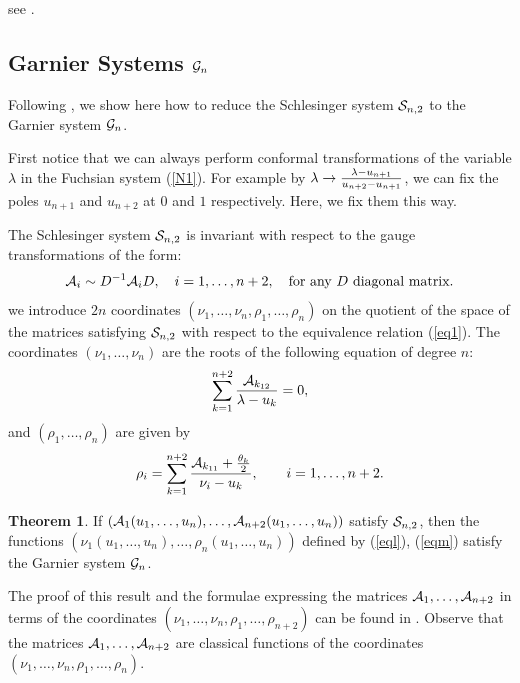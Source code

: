 \documentclass[12pt]{article}
\theoremstyle{definition}
\theoremstyle{theorem}
\newtheorem{thm}[df]{Theorem}
\begin{document}
 see \cite{Dek,AB}.





\subsection{Garnier Systems ${\cal G}_n$}

Following \cite{IKSY}, we show here how to reduce the Schlesinger 
system ${\cal S}_{n,2}$ to the Garnier system ${\cal G}_n$. 

First notice that we can always perform conformal transformations 
of the variable $\lambda$ in the Fuchsian system (\ref{N1}). For
example by $\lambda\to {\lambda-u_{n+1}\over u_{n+2}-u_{n+1}}$, 
we can fix the poles $u_{n+1}$ and $u_{n+2}$ at $0$ and $1$ 
respectively. Here, we fix them this way. 

The Schlesinger system ${\cal S}_{n,2}$ is invariant 
with respect to the gauge transformations of the form:
\begin{equation}
{\cal A}_i\sim D^{-1} {\cal A}_i D,\quad i=1,\dots,n+2,
\quad\hbox{for any $D$ diagonal matrix}.
\label{eq1}
\end{equation}
we introduce $2n$ coordinates 
$(\nu_1,\dots,\nu_{n},\rho_1,\dots,\rho_{n})$ on the quotient 
of the space of the matrices satisfying ${\cal S}_{n,2}$ with respect 
to the equivalence relation (\ref{eq1}).
The coordinates $(\nu_1,\dots,\nu_{n})$ are the roots of the 
following equation of degree $n$:
\begin{equation}
\sum_{k=1}^{n+2}{{\cal A}_{k_{12}}\over\lambda-u_k}=0, 
\label{eql}\end{equation}
and $(\rho_1,\dots,\rho_{n})$ are given by
\begin{equation}
\rho_i=\sum_{k=1}^{n+2}{{\cal A}_{k_{11}}+
{\theta_k\over2}\over\nu_i-u_k}, \qquad
i=1,\dots,n+2.
\label{eqm}\end{equation}


\begin{thm}
If $\left({\cal A}_1(u_1,\dots,u_{n}),\dots,
{\cal A}_{n+2}(u_1,\dots,u_{n})\right)$ 
satisfy ${\cal S}_{n,2}$, then the functions
$\left(\nu_1(u_1,\dots,u_{n}),
\dots,\rho_{n}(u_1,\dots,u_{n})\right)$ 
defined by (\ref{eql}), (\ref{eqm}) satisfy the Garnier system 
${\cal G}_n$.
\end{thm}

\noindent The proof of this result and the formulae expressing the
matrices ${\cal A}_1,\dots,{\cal A}_{n+2}$ in terms of the
coordinates $(\nu_1,\dots,\nu_{n},\rho_1,\dots,\rho_{n+2})$ 
can be found in \cite{IKSY}. Observe that the matrices 
${\cal A}_1,\dots,{\cal A}_{n+2}$ are classical functions of the
coordinates $(\nu_1,\dots,\nu_{n},\rho_1,\dots,\rho_{n})$.
\end{document}
